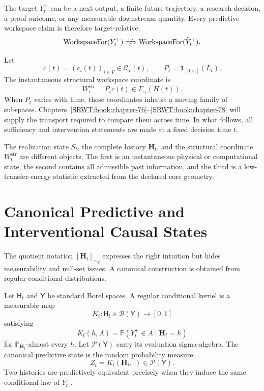 The target \(Y_t^+\) can be a next output, a finite future trajectory, a
research decision, a proof outcome, or any measurable downstream quantity.
Every predictive workspace claim is therefore target-relative:
\[
\operatorname{WorkspaceFor}(Y_t^+)
\centernot\Longrightarrow
\operatorname{WorkspaceFor}(\widetilde Y_t^+).
\]

Let
\[
c(t)=(c_i(t))_{i\in V}
\in
\mathcal C_V(t),
\qquad
P_t=\mathbf 1_{[0,\varepsilon_t]}(L_t).
\]
The instantaneous structural workspace coordinate is
\[
\boxed{
W_t^{\mathrm{str}}=P_tc(t)
\in
\Gamma_{\varepsilon_t}(H(t)).
}
\]
When \(P_t\) varies with time, these coordinates inhabit a moving family of
subspaces. Chapters~\ref{SRWT:book:chapter-76}--\ref{SRWT:book:chapter-78} will supply the transport required to compare them
across time. In what follows, all sufficiency and intervention statements
are made at a fixed decision time \(t\).

\begin{SRWTremark}
The realization state \(S_t\), the complete history \(\mathbf H_t\), and the
structural coordinate \(W_t^{\mathrm{str}}\) are different objects. The first
is an instantaneous physical or computational state, the second contains all
admissible past information, and the third is a low-transfer-energy statistic
extracted from the declared core geometry.
\end{SRWTremark}

\section{Canonical Predictive and Interventional Causal States}

The quotient notation
\([\mathbf H_t]_{\sim_Y}\) expresses the right intuition but hides
measurability and null-set issues. A canonical construction is obtained from
regular conditional distributions.

\begin{SRWTdefinition}\label{SRWT:def:predictive-kernel}
Let \(\mathsf H_t\) and \(\mathsf Y\) be standard Borel spaces. A regular
conditional kernel is a measurable map
\[
K_t:\mathsf H_t\times\mathcal B(\mathsf Y)\to[0,1]
\]
satisfying
\[
K_t(h,A)
=
\mathbb P(Y_t^+\in A\mid\mathbf H_t=h)
\]
for \(\mathbb P_{\mathbf H_t}\)-almost every \(h\). Let
\(\mathcal P(\mathsf Y)\) carry its evaluation sigma-algebra. The canonical
predictive state is the random probability measure
\[
\boxed{
Z_t
=
K_t(\mathbf H_t,\cdot)
\in
\mathcal P(\mathsf Y).
}
\]
Two histories are predictively equivalent precisely when they induce the same
conditional law of \(Y_t^+\).
\end{SRWTdefinition}

